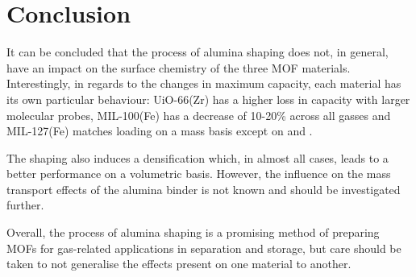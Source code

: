 
\section{Conclusion}

It can be concluded that the process of alumina shaping does not, in 
general, have an impact on the surface chemistry of the three MOF
materials. Interestingly, in regards to the changes in maximum capacity,
each material has its own particular behaviour: UiO-66(Zr) has a higher loss in 
capacity with larger molecular probes, MIL-100(Fe) has a decrease 
of 10-20\% across all gasses and MIL-127(Fe) matches loading on 
a mass basis except on  and .

The shaping also induces a densification which, in almost all cases,
leads to a better performance on a volumetric basis. However, the 
influence on the mass transport effects of the alumina binder is 
not known and should be investigated further. 

Overall, the process of alumina shaping is a promising method of 
preparing MOFs for gas-related applications in separation and 
storage, but care should be taken to not generalise the effects
present on one material to another. 
